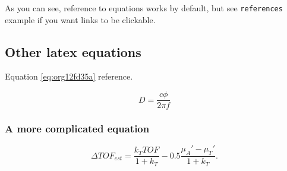 As you can see, reference to equations works by default, but see \texttt{references}
example if you want links to be clickable.

\subsection{Other latex equations}
\label{sec:org7ccafe0}
Equation \ref{eq:org12fd35a} reference.

\begin{equation}
\label{eq:org12fd35a}
D = \frac{c\phi}{2\pi f}
\end{equation}

\subsubsection{A more complicated equation}
\label{sec:org2873b14}

\begin{equation}
\Delta TOF_{est} = \frac{k_T TOF}{1+k_T } - 0.5 \frac{\mu_A' - \mu_T'}{1+k_T}.
\end{equation}


